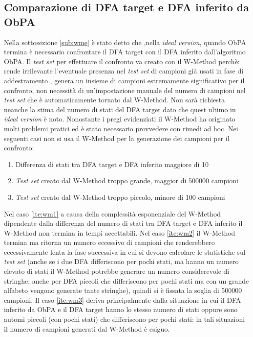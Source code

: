 \subsection[Valutazione DFA inferito]{Comparazione di DFA target e DFA inferito da ObPA}
\label{sub:comdfa}
Nella sottosezione \ref{sub:wme} è stato detto che ,nella \textit{ideal version}, quando \ac{ObPA} termina è necessario confrontare il \ac{DFA} target con il \ac{DFA} inferito dall'algoritmo \ac{ObPA}. Il \textit{test set} per effettuare il confronto va creato con il W-Method perchè: rende irrilevante l'eventuale presenza nel \textit{test set} di campioni già usati in fase di addestramento , genera un insieme di campioni estremamente significativo per il confronto, non necessità di un'impostazione manuale del numero di campioni nel \textit{test set} che è automaticamente tornato dal W-Method. Non sarà richiesta neanche la stima del numero di stati del \ac{DFA} target dato che quest ultimo in \textit{ideal version} è noto. Nonostante i pregi evidenziati il W-Method ha originato molti problemi pratici ed è stato necessario provvedere con rimedi ad hoc. Nei seguenti casi non si usa il W-Method per la generazione dei campioni per il confronto:
\begin{enumerate}
\item \label{ite:wm1}Differenza di stati tra \ac{DFA} target e \ac{DFA} inferito maggiore di 10
\item \label{ite:wm2} \textit{Test set} creato dal W-Method troppo grande, maggior di 500000 campioni
\item \label{ite:wm3} \textit{Test set} creato dal W-Method troppo piccolo, minore di 100 campioni
\end{enumerate}
 Nel caso \ref{ite:wm1} a causa della complessità esponenziale del W-Method dipendente dalla differenza del numero di stati tra \ac{DFA} target e \ac{DFA} inferito il W-Method non termina in tempi accettabili. Nel caso \ref{ite:wm2} il W-Method termina ma ritorna un numero eccessivo di campioni che renderebbero eccessivamente lenta la fase successiva in cui si devono calcolare le statistiche sul \textit{test set} (anche se i due \ac{DFA} differiscono per pochi stati, ma hanno un numero elevato di stati il W-Method potrebbe generare un numero considerevole di stringhe; anche per \ac{DFA} piccoli che differiscono per pochi stati ma con un grande alfabeto vengono generate tante stringhe), quindi si è fissata la soglia di 500000 campioni.  Il caso \ref{ite:wm3} deriva principalmente dalla situazione in cui il \ac{DFA} inferito da \ac{ObPA} e il \ac{DFA} target hanno lo stesso numero di stati oppure sono automi piccoli (con pochi stati) che differiscono per pochi stati: in tali situazioni il numero di campioni generati dal W-Method è esiguo.
 
